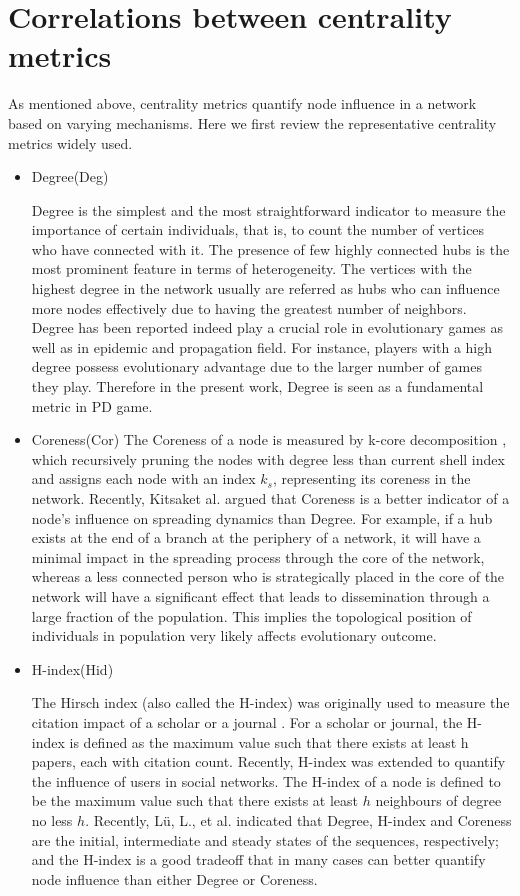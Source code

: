 \documentclass[preprint,12pt,3p]{elsarticle}
\begin{document}
\section{Correlations between centrality metrics}
\label{centrality,option, corr}
As mentioned above, centrality metrics quantify node influence in a network based on varying mechanisms.
Here we first review the representative centrality metrics widely used.
\begin{itemize}

\item Degree(Deg)

Degree is the simplest and the most straightforward indicator to measure the importance
of certain individuals, that is, to count the number of vertices who have connected with it.
The presence of few highly connected hubs is the most prominent feature in terms of heterogeneity.
The vertices with the highest degree in the network usually are referred as hubs who
can influence more nodes effectively due to having the greatest number of neighbors.
Degree has been reported indeed play a crucial role in evolutionary games as well as in epidemic and propagation field.
For instance, players with a high degree possess evolutionary advantage due to the larger
number of games they play.
Therefore in the present work, Degree is seen as a fundamental metric in PD game.

\item Coreness(Cor)
The Coreness of a node is measured by k-core decomposition \cite{DorogovtsevGoltsev-18309} ,
which recursively pruning the nodes with degree less than current shell index and assigns each node with
an index $k_s$, representing its coreness in the network.
Recently, Kitsaket al. \cite{KitsakGallos-17826} argued that Coreness is a better indicator of a node’s
influence on spreading dynamics than Degree.
For example, if a hub exists at the end of a branch at the periphery of a network, it will have a minimal impact in the spreading process through the core of the network,
whereas a less connected person who is strategically placed in
the core of the network will have a significant effect that leads
to dissemination through a large fraction of the population.
This implies the topological position of individuals in population very likely affects evolutionary outcome.

\item H-index(Hid)

The Hirsch index (also called the H-index)\cite{Hirsch-18310} was originally used
to measure the citation impact of a scholar or a journal \cite{BraunGlänzel-18314}.
For a scholar or journal, the H-index is defined as the maximum value such
that there exists at least h papers, each with citation count.
Recently, H-index was extended to quantify the influence of users in social networks.
The H-index of a node is defined to be the maximum value such that there
exists at least $h$ neighbours of degree no less $h$.
Recently, Lü, L., et al.\cite{LüZhou-18192} indicated that Degree, H-index and Coreness are the initial, intermediate and steady states of the sequences, respectively;
and the H-index is a good tradeoff that in many cases can better quantify node influence than either
Degree or Coreness.


\end{itemize}
\end{document}
